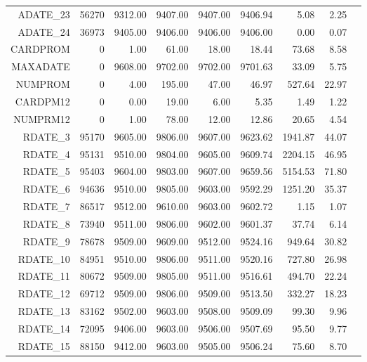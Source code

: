 \begin{longtable}{|rrrrrrrrr|}
	ADATE\_23  &  56270  &  9312.00  &  9407.00  &  9407.00  &  9406.94  &  5.08  &  2.25 & \\
	ADATE\_24  &  36973  &  9405.00  &  9406.00  &  9406.00  &  9406.00  &  0.00  &  0.07 & \\
	CARDPROM  &  0  &  1.00  &  61.00  &  18.00  &  18.44  &  73.68  &  8.58 & \\
	MAXADATE  &  0  &  9608.00  &  9702.00  &  9702.00  &  9701.63  &  33.09  &  5.75 & \\
	NUMPROM  &  0  &  4.00  &  195.00  &  47.00  &  46.97  &  527.64  &  22.97 & \\
	CARDPM12  &  0  &  0.00  &  19.00  &  6.00  &  5.35  &  1.49  &  1.22 & \\
	NUMPRM12  &  0  &  1.00  &  78.00  &  12.00  &  12.86  &  20.65  &  4.54 & \\
	RDATE\_3  &  95170  &  9605.00  &  9806.00  &  9607.00  &  9623.62  &  1941.87  &  44.07 & \\
	RDATE\_4  &  95131  &  9510.00  &  9804.00  &  9605.00  &  9609.74  &  2204.15  &  46.95 & \\
	RDATE\_5  &  95403  &  9604.00  &  9803.00  &  9607.00  &  9659.56  &  5154.53  &  71.80 & \\
	RDATE\_6  &  94636  &  9510.00  &  9805.00  &  9603.00  &  9592.29  &  1251.20  &  35.37 & \\
	RDATE\_7  &  86517  &  9512.00  &  9610.00  &  9603.00  &  9602.72  &  1.15  &  1.07 & \\
	RDATE\_8  &  73940  &  9511.00  &  9806.00  &  9602.00  &  9601.37  &  37.74  &  6.14 & \\
	RDATE\_9  &  78678  &  9509.00  &  9609.00  &  9512.00  &  9524.16  &  949.64  &  30.82 & \\
	RDATE\_10  &  84951  &  9510.00  &  9806.00  &  9511.00  &  9520.16  &  727.80  &  26.98 & \\
	RDATE\_11  &  80672  &  9509.00  &  9805.00  &  9511.00  &  9516.61  &  494.70  &  22.24 & \\
	RDATE\_12  &  69712  &  9509.00  &  9806.00  &  9509.00  &  9513.50  &  332.27  &  18.23 & \\
	RDATE\_13  &  83162  &  9502.00  &  9603.00  &  9508.00  &  9509.09  &  99.30  &  9.96 & \\
	RDATE\_14  &  72095  &  9406.00  &  9603.00  &  9506.00  &  9507.69  &  95.50  &  9.77 & \\
	RDATE\_15  &  88150  &  9412.00  &  9603.00  &  9505.00  &  9506.24  &  75.60  &  8.70 & \\

\end{longtable}
